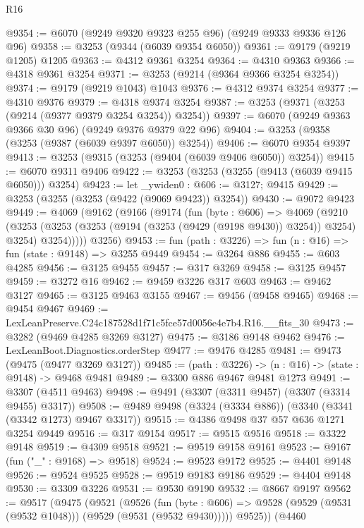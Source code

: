 \begin{lexlean}{R16}
\begin{coremodule}
@9354 := @6070 (@9249 @9320 @9323 @255 @96) (@9249 @9333 @9336 @126 @96)
@9358 := @3253 (@9344 (@6039 @9354 @6050))
@9361 := @9179 (@9219 @1205) @1205
@9363 := @4312 @9361 @3254
@9364 := @4310 @9363
@9366 := @4318 @9361 @3254
@9371 := @3253 (@9214 (@9364 @9366 @3254 @3254))
@9374 := @9179 (@9219 @1043) @1043
@9376 := @4312 @9374 @3254
@9377 := @4310 @9376
@9379 := @4318 @9374 @3254
@9387 := @3253 (@9371 (@3253 (@9214 (@9377 @9379 @3254 @3254)) @3254))
@9397 := @6070 (@9249 @9363 @9366 @30 @96) (@9249 @9376 @9379 @22 @96)
@9404 := @3253 (@9358 (@3253 (@9387 (@6039 @9397 @6050)) @3254))
@9406 := @6070 @9354 @9397
@9413 := @3253 (@9315 (@3253 (@9404 (@6039 @9406 @6050)) @3254))
@9415 := @6070 @9311 @9406
@9422 := @3253 (@3253 (@3255 (@9413 (@6039 @9415 @6050))) @3254)
@9423 := let _ywiden0 : @606 := @3127; @9415
@9429 := @3253 (@3255 (@3253 (@9422 (@9069 @9423)) @3254))
@9430 := @9072 @9423
@9449 := @4069
    (@9162
      (@9166
        (@9174
          (fun (byte : @606) =>
          @4069
            (@9210
              (@3253
                (@3253 (@3253 (@9194 (@3253 (@9429 (@9198 @9430)) @3254)) @3254) @3254)
                @3254)))))
      @3256)
@9453 := fun (path : @3226) => fun (n : @16) => fun (state : @9148) => @3255 @9449
@9454 := @3264 @886
@9455 := @603 @4285
@9456 := @3125 @9455
@9457 := @317 @3269
@9458 := @3125 @9457
@9459 := @3272 @16
@9462 := @9459 @3226 @317 @603
@9463 := @9462 @3127
@9465 := @3125 @9463 @3155
@9467 := @9456 (@9458 @9465)
@9468 := @9454 @9467
@9469 := LexLeanPreserve.C24c187528d1f71c5fce57d0056e4e7b4.R16.__fits_30
@9473 := @3282 (@9469 @4285 @3269 @3127)
@9475 := @3186 @9148 @9462
@9476 := LexLeanBoot.Diagnostics.orderStep
@9477 := @9476 @4285
@9481 := @9473 (@9475 (@9477 @3269 @3127))
@9485 := (path : @3226) -> (n : @16) -> (state : @9148) -> @9468 @9481
@9489 := @3300 @886 @9467 @9481 @1273
@9491 := @3307 (@4511 @9463)
@9498 := @9491 (@3307 (@3311 @9457) (@3307 (@3314 @9455) @3317))
@9508 := @9489 @9498 (@3324 (@3334 @886)) (@3340 (@3341 (@3342 @1273) @9467 @3317))
@9515 := @4386 @9498 @37 @57 @636 @1271 @3254 @9449
@9516 := @317 @9154
@9517 := @9515 @9516
@9518 := @3322 @9148
@9519 := @4309 @9518
@9521 := @9519 @9158 @9161
@9523 := @9167 (fun ("_" : @9168) => @9518)
@9524 := @9523 @9172
@9525 := @4401 @9148
@9526 := @9524 @9525
@9528 := @9519 @9183 @9186
@9529 := @4404 @9148
@9530 := @3309 @3226
@9531 := @9530 @9190
@9532 := @8667 @9197
@9562 := @9517
    (@9475
      (@9521
        (@9526
          (fun (byte : @606) => @9528 (@9529 (@9531 (@9532 @1048))) (@9529 (@9531 (@9532 @9430)))))
        @9525))
    (@4460

\end{coremodule}
\end{lexlean}
